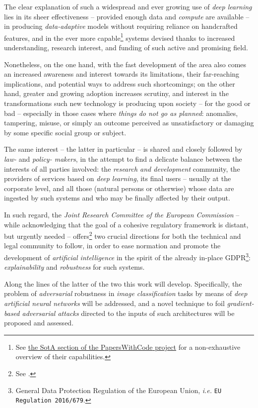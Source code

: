 The clear explanation of such a widespread and ever growing use of \textit{deep learning} lies in its sheer effectiveness -- provided enough data and \textit{compute} are available -- in producing \textit{data-adaptive} models without requiring reliance on handcrafted features, and in the ever more capable\footnote{See \href{https://paperswithcode.com/sota}{the SotA section of the {PapersWithCode} project} for a non-exhaustive overview of their capabilities.} systems devised thanks to increased understanding, research interest, and funding of such active and promising field.

Nonetheless, on the one hand, with the fast development of the area also comes an increased awareness and interest towards its limitations, their far-reaching implications, and potential ways to address such shortcomings; on the other hand, greater and growing adoption increases scrutiny, and interest in the transformations such new technology is producing upon society -- for the good or bad -- especially in those cases where \textit{things do not go as planned}: anomalies, tampering, misuse, or simply an outcome perceived as unsatisfactory or damaging by some specific social group or subject.

The same interest -- the latter in particular -- is shared and closely followed by \textit{law-} and \textit{policy- makers}, in the attempt to find a delicate balance between the interests of all parties involved: the \textit{research and development} community, the providers of services based on \textit{deep learning}, its final users -- usually at the corporate level, and all those (natural persons or otherwise) whose data are ingested by such systems and who may be finally affected by their output.

In such regard, the \textit{Joint Research Committee of the European Commission} -- while acknowledging that the goal of a cohesive regulatory framework is distant, but urgently needed -- offers\footnote{See \cite{HamonEtAl2020Europe}.} two crucial directions for both the technical and legal community to follow, in order to ease normation and promote the development of \textit{artificial intelligence} in the spirit of the already in-place GDPR\footnote{General Data Protection Regulation of the European Union, \textit{i.e.} \texttt{EU Regulation 2016/679}.}: \textit{explainability} and \textit{robustness} for such systems.

Along the lines of the latter of the two this work will develop. Specifically, the problem of \textit{adversarial} robustness in \textit{image classification} tasks by means of \textit{deep artificial neural networks} will be addressed, and a novel technique to foil \textit{gradient-based adversarial attacks} directed to the inputs of such architectures will be proposed and assessed.

